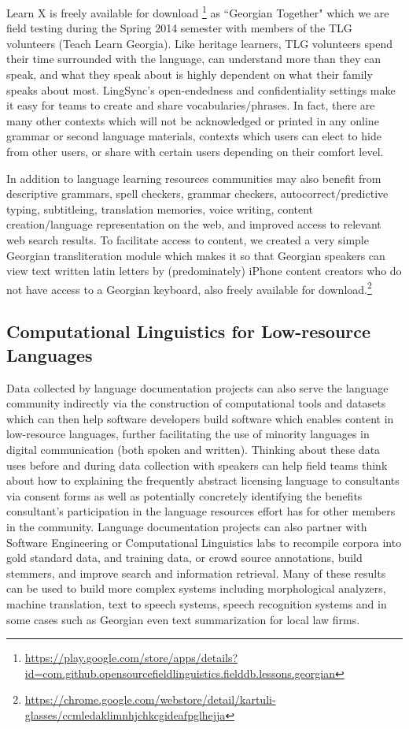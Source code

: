 \documentclass[11pt]{article}
\begin{document}
Learn X is freely available for download%
\footnote{\url{https://play.google.com/store/apps/details?id=com.github.opensourcefieldlinguistics.fielddb.lessons.georgian}} %
 as ``Georgian Together" which we are field testing during the Spring 2014 semester with members of the TLG volunteers (Teach Learn Georgia).
Like heritage learners, TLG volunteers spend their time surrounded with the
language, can understand more than they can speak, and what they speak about is
highly dependent on what their family speaks about most. LingSync's
open-endedness and confidentiality settings make it easy for teams to create
and share vocabularies/phrases.
In fact, there are many other contexts which will not be acknowledged or printed
in any online grammar or second language materials, contexts which users can
elect to hide from other users, or share with certain users depending on their
comfort level.

In addition to language learning resources communities may also benefit from descriptive grammars,  spell checkers, grammar checkers, autocorrect/predictive typing, subtitleing, translation memories, voice writing, content creation/language representation on the web, and improved access to relevant web search results. To facilitate access to content, we created a very simple Georgian transliteration module which makes it so that Georgian speakers can view text written latin letters by (predominately) iPhone content creators who do not have access to a Georgian keyboard, also freely available for download.\footnote{\url{https://chrome.google.com/webstore/detail/kartuli-glasses/ccmledaklimnhjchkcgideafpglhejja}}

\subsection{Computational Linguistics for Low-resource Languages}

Data collected by language documentation projects can also serve the language community indirectly via the construction of computational tools and datasets which can then help software developers build software which enables content in low-resource languages, further facilitating the use of minority languages in digital communication (both spoken and written). Thinking about these data uses before and during data collection with speakers can help field teams think about how to explaining the frequently abstract licensing language to consultants via consent forms as well as potentially concretely identifying the benefits  consultant's participation in the language resources effort has for other members in the community. Language documentation projects can also partner with Software Engineering or Computational Linguistics labs to recompile corpora into gold standard data, and training data, or crowd source annotations, build stemmers, and improve search and information retrieval. Many of these results can be used to build more complex systems including morphological analyzers, machine translation, text to speech systems, speech recognition systems and in some cases such as Georgian even text summarization for local law firms.
\end{document}
